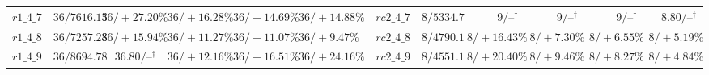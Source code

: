 {\begin{tabular}{@{}lrrrrr c lrrrrr@{}}
$r1\_4\_7$ & $36/7616.15$ & $36/+27.20\%$ & $36/+16.28\%$ & $36/+14.69\%$ & \textbf{$36/+14.88\%$} & & $rc2\_4\_7$ & $8/5334.72$ & $9/\text{--}{}^\dagger$ & $9/\text{--}{}^\dagger$ & $9/\text{--}{}^\dagger$ & \textbf{$8.80/\text{--}{}^\dagger$}\\
$r1\_4\_8$ & $36/7257.28$ & $36/+15.94\%$ & $36/+11.27\%$ & $36/+11.07\%$ & \textbf{$36/+9.47\%$} & & $rc2\_4\_8$ & $8/4790.14$ & $8/+16.43\%$ & $8/+7.30\%$ & $8/+6.55\%$ & \textbf{$8/+5.19\%$}\\
$r1\_4\_9$ & $36/8694.78$ & $36.80/\text{--}{}^\dagger$ & $36/+12.16\%$ & $36/+16.51\%$ & \textbf{$36/+24.16\%$} & & $rc2\_4\_9$ & $8/4551.11$ & $8/+20.40\%$ & $8/+9.46\%$ & $8/+8.27\%$ & \textbf{$8/+4.84\%$}\\
\bottomrule
\end{tabular}}
